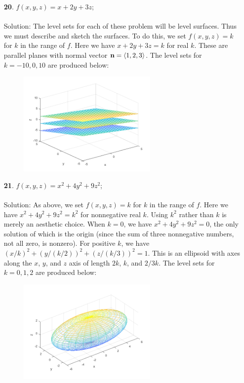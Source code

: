 \documentclass[12pt]{amsbook}
\newcommand{\la}{\langle}
\newcommand{\ra}{\rangle}
\begin{document}
\begin{enumerate}
  \item[{\small\bf 20}.] $f(x,y,z)=x+2y+3z$;
  \\
  \\
  {\sc Solution}: The level sets for each of these problem will be level surfaces. Thus we must describe and sketch the surfaces. To do this, we set $f(x,y,z)=k$ for $k$ in the range of $f$. Here we have $x+2y+3z=k$ for real $k$. These are parallel planes with normal vector ${\bf n}=\la 1,2,3 \ra$. The level sets for $k=-10,0,10$ are produced below:
  \begin{center}
  \includegraphics[width=3.5in,height=2.0in]{3_1_20.png}
  \end{center}
  \item[{\small\bf 21}.] $f(x,y,z)=x^2+4y^2+9z^2$;
  \\
  \\
  {\sc Solution}: As above, we set $f(x,y,z)=k$ for $k$ in the range of $f$. Here we have $x^2+4y^2+9z^2=k^2$ for nonnegative real $k$. Using $k^2$ rather than $k$ is merely an aesthetic choice. When $k=0$, we have $x^2+4y^2+9z^2=0$, the only solution of which is the origin (since the sum of three nonnegative numbers, not all zero, is nonzero). For positive $k$, we have $(x/k)^2+(y/(k/2))^2+(z/(k/3))^2=1$. This is an ellipsoid with axes along the $x$, $y$, and $z$ axis of length $2k$, $k$, and $2/3k$. The level sets for $k=0,1,2$ are produced below:
  \begin{center}
  \includegraphics[width=3.5in,height=2.0in]{3_1_21.png}

\end{center}
\end{enumerate}
\end{document}
